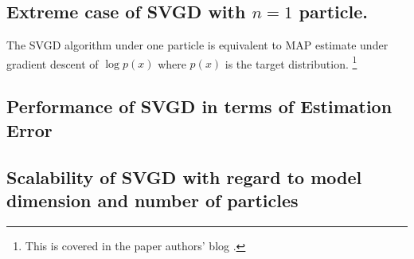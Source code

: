 \subsection{Extreme case of SVGD with $n=1$ particle.} 

The SVGD algorithm under one particle is equivalent to MAP estimate under gradient descent of $\log p(x)$ where $p(x)$ is the target distribution. \footnote{This is covered in the paper authors' blog \url{}.}

\subsection{Performance of SVGD in terms of Estimation Error}


\subsection{Scalability of SVGD with regard to model dimension and number of particles}